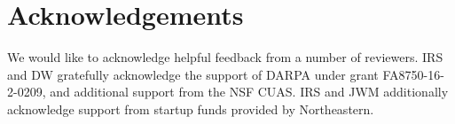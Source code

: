 \documentclass[twoside]{article}
\begin{document}
\section{Acknowledgements}

We would like to acknowledge helpful feedback from a number of reviewers. IRS and DW  gratefully acknowledge the support of DARPA under grant FA8750-16-2-0209, and additional support from the NSF CUAS. IRS and JWM additionally acknowledge support from startup funds provided by Northeastern.

%
%
\printbibliography
\end{document}
